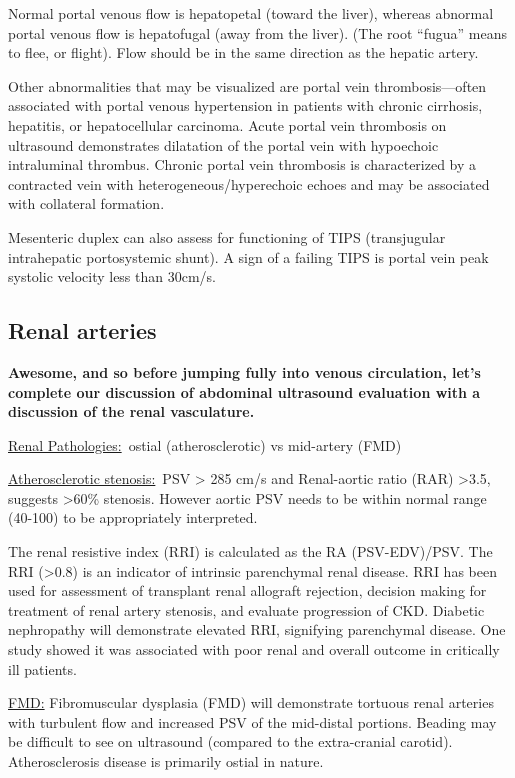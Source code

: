 \documentclass[
]{book}
\begin{document}
Normal portal venous flow is hepatopetal (toward the liver), whereas
abnormal portal venous flow is hepatofugal (away from the liver). (The
root ``fugua'' means to flee, or flight). Flow should be in the same
direction as the hepatic artery.

Other abnormalities that may be visualized are portal vein
thrombosis---often associated with portal venous hypertension in
patients with chronic cirrhosis, hepatitis, or hepatocellular carcinoma.
Acute portal vein thrombosis on ultrasound demonstrates dilatation of
the portal vein with hypoechoic intraluminal thrombus. Chronic portal
vein thrombosis is characterized by a contracted vein with
heterogeneous/hyperechoic echoes and may be associated with collateral
formation.\citep{chawla2015, nouvini2013}

Mesenteric duplex can also assess for functioning of TIPS (transjugular
intrahepatic portosystemic shunt). A sign of a failing TIPS is portal
vein peak systolic velocity less than 30cm/s.

\hypertarget{renal-arteries}{%
\subsection{Renal arteries}\label{renal-arteries}}

\textbf{Awesome, and so before jumping fully into venous circulation, let's
complete our discussion of abdominal ultrasound evaluation with a
discussion of the renal vasculature.}

\uline{Renal Pathologies:}~ostial (atherosclerotic) vs mid-artery
(FMD)

\uline{Atherosclerotic stenosis:}~PSV \textgreater{} 285 cm/s and Renal-aortic
ratio (RAR) \textgreater3.5, suggests \textgreater60\% stenosis.\citep{schäberle2016} However
aortic PSV needs to be within normal range (40-100) to be appropriately
interpreted.

The renal resistive index (RRI) is calculated as the RA (PSV-EDV)/PSV.
The RRI (\textgreater0.8) is an indicator of intrinsic parenchymal renal disease.
RRI has been used for assessment of transplant renal allograft
rejection, decision making for treatment of renal artery stenosis, and
evaluate progression of CKD. Diabetic nephropathy will demonstrate
elevated RRI, signifying parenchymal disease.\citep{viazzi2014} One study
showed it was associated with poor renal and overall outcome in
critically ill patients.\citep{ledorze2012}

\uline{FMD:} Fibromuscular dysplasia (FMD) will demonstrate
tortuous renal arteries with turbulent flow and increased PSV of the
mid-distal portions. Beading may be difficult to see on ultrasound
(compared to the extra-cranial carotid). Atherosclerosis disease is
primarily ostial in nature.
\end{document}
